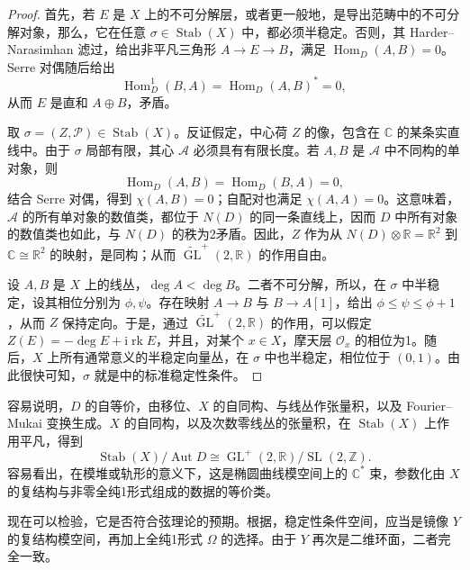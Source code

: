 \begin{proof}
首先，若 $E$ 是 $X$ 上的不可分解层，或者更一般地，是导出范畴中的不可分解对象，那么，它在任意 $\sigma\in\operatorname{Stab}(X)$ 中，都必须半稳定。否则，其 Harder--Narasimhan 滤过，给出非平凡三角形 $A\to E\to B$，满足 $\operatorname{Hom}_D(A,B)=0$。Serre 对偶随后给出
\[
\operatorname{Hom}_D^1(B,A)=\operatorname{Hom}_D(A,B)^*=0,
\]
从而 $E$ 是直和 $A\oplus B$，矛盾。

取 $\sigma=(Z,\mathcal{P})\in\operatorname{Stab}(X)$。反证假定，中心荷 $Z$ 的像，包含在 $\mathbb{C}$ 的某条实直线中。由于 $\sigma$ 局部有限，其心 $\mathcal{A}$ 必须具有有限长度。若 $A,B$ 是 $\mathcal{A}$ 中不同构的单对象，则
\[
\operatorname{Hom}_D(A,B)=\operatorname{Hom}_D(B,A)=0,
\]
结合 Serre 对偶，得到 $\chi(A,B)=0$；自配对也满足 $\chi(A,A)=0$。这意味着，$\mathcal{A}$ 的所有单对象的数值类，都位于 $N(D)$ 的同一条直线上，因而 $D$ 中所有对象的数值类也如此，与 $N(D)$ 的秩为2矛盾。因此，$Z$ 作为从 $N(D)\otimes\mathbb{R}=\mathbb{R}^2$ 到 $\mathbb{C}\cong\mathbb{R}^2$ 的映射，是同构；从而 $\widetilde{\operatorname{GL}}^{+}(2,\mathbb{R})$ 的作用自由。

设 $A,B$ 是 $X$ 上的线丛，$\deg A<\deg B$。二者不可分解，所以，在 $\sigma$ 中半稳定，设其相位分别为 $\phi,\psi$。存在映射 $A\to B$ 与 $B\to A[1]$，给出 $\phi\le\psi\le\phi+1$，从而 $Z$ 保持定向。于是，通过 $\widetilde{\operatorname{GL}}^{+}(2,\mathbb{R})$ 的作用，可以假定 $Z(E)=-\deg E+\mathrm{i}\operatorname{rk}E$，并且，对某个 $x\in X$，摩天层 $\mathcal{O}_x$ 的相位为1。随后，$X$ 上所有通常意义的半稳定向量丛，在 $\sigma$ 中也半稳定，相位位于 $(0,1)$。由此很快可知，$\sigma$ 就是中的标准稳定性条件。
\end{proof}

容易说明，$D$ 的自等价，由移位、$X$ 的自同构、与线丛作张量积，以及 Fourier--Mukai 变换生成。$X$ 的自同构，以及次数零线丛的张量积，在 $\operatorname{Stab}(X)$ 上作用平凡，得到
\begin{equation}\label{eq:5.200}
\operatorname{Stab}(X)/\operatorname{Aut}D
\cong\operatorname{GL}^{+}(2,\mathbb{R})/\operatorname{SL}(2,\mathbb{Z}).
\end{equation}
容易看出，在模堆或轨形的意义下，这是椭圆曲线模空间上的 $\mathbb{C}^*$ 束，参数化由 $X$ 的复结构与非零全纯1形式组成的数据的等价类。

现在可以检验，它是否符合弦理论的预期。根据，稳定性条件空间，应当是镜像 $Y$ 的复结构模空间，再加上全纯1形式 $\Omega$ 的选择。由于 $Y$ 再次是二维环面，二者完全一致。

